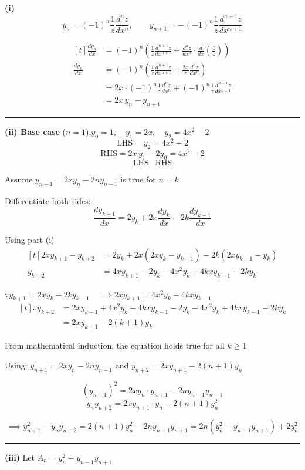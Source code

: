 ﻿\documentclass[12pt]{article}
\begin{document}
\textbf{(i)}
$$y_n=(-1)^n \frac{1}{z}\frac{d^n z}{dx^n}, \qquad y_{n+1}=-(-1)^n\frac{1}{z}\frac{d^{n+1}z}{dx^{n+1}}$$


\[
\begin{aligned}[t]
\frac{dy_n}{dx}&=(-1)^n\left(\frac{1}{z}\frac{d^{n+1} z}{dx^{n+1}}+\frac{d^n z}{dx^n}\cdot\frac{d}{dx}\left(\frac{1}{z}\right)\right)\\
\frac{dy_n}{dx}&=(-1)^n\left(\frac{1}{z}\frac{d^{n+1}z}{dx^{n+1}}+\frac{2x}{z}\frac{d^n z}{dx^n}\right)\\
&=2x\cdot(-1)^n\frac{1}{z}\frac{d^n z}{dx^n}+(-1)^n\frac{1}{z}\frac{d^{n+1}z}{dx^{n+1}}\\
&=2x\,y_n-y_{n+1}
\end{aligned}
\]

\bigskip\hrule\bigskip

\textbf{(ii) Base case} ($n=1$),\qquad$y_0=1,\quad y_1=2x,\quad y_2=4x^2-2$
$$\text{LHS}=y_2=4x^2-2$$
$$\text{RHS}=2x\,y_1-2y_0=4x^2-2$$
$$\text{LHS}=\text{RHS}$$

Assume $y_{n+1}=2xy_n-2ny_{n-1}$ is true for $n=k$

Differentiate both sides:
$$\frac{dy_{k+1}}{dx}=2y_k+2x\frac{dy_k}{dx}-2k\frac{dy_{k-1}}{dx}$$

Using part (i)
\[
\begin{aligned}[t]
2xy_{k+1}-y_{k+2}&=2y_k+2x(2xy_k-y_{k+1})-2k(2xy_{k-1}-y_k)\\
y_{k+2}&=4xy_{k+1}-2y_k-4x^2y_k+4kxy_{k-1}-2ky_k
\end{aligned}
\]

$\because y_{k+1}=2xy_k-2ky_{k-1} \quad \implies 2xy_{k+1}=4x^2y_k-4kxy_{k-1}$
\[
\begin{aligned}[t]
\therefore y_{k+2}&=2xy_{k+1}+4x^2y_k-4kxy_{k-1}-2y_k-4x^2y_k+4kxy_{k-1}-2ky_k\\
&=2xy_{k+1}-2(k+1)y_k
\end{aligned}
\]

From mathematical induction, the equation holds true for all $k\geq 1$

\bigskip
Using: $y_{n+1}=2xy_n-2ny_{n-1}$ and $y_{n+2}=2xy_{n+1}-2(n+1)y_n$

$$(y_{n+1})^2=2xy_n\cdot y_{n+1}-2ny_{n-1}y_{n+1}$$
$$y_n y_{n+2}=2xy_{n+1}\cdot y_n-2(n+1)y_n^2$$

$$\implies y_{n+1}^2-y_ny_{n+2}=2(n+1)y_n^2-2ny_{n-1}y_{n+1}=2n(y_n^2-y_{n-1}y_{n+1})+2y_n^2$$

\bigskip\hrule\bigskip

\textbf{(iii)} Let $A_n=y_n^2-y_{n-1}y_{n+1}$
\end{document}
